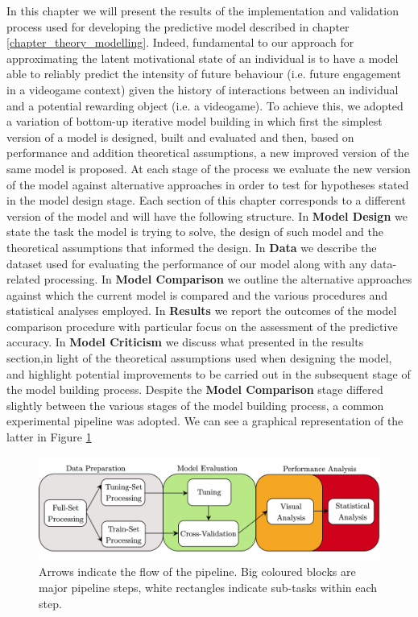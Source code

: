 In this chapter we will present the results of the implementation and validation process used for developing the predictive model described in chapter \ref{chapter_theory_modelling}. Indeed, fundamental to our approach for approximating the latent motivational state of an individual is to have a model able to reliably predict the intensity of future behaviour (i.e. future engagement in a videogame context) given the history of interactions between an individual and a potential rewarding object (i.e. a videogame). To achieve this, we adopted a variation of bottom-up iterative model building \cite{gelman2020bayesian} in which first the simplest version of a model is designed, built and evaluated and then, based on performance and addition theoretical assumptions, a new improved version of the same model is proposed. At each stage of the process we evaluate the new version of the model against alternative approaches in order to test for hypotheses stated in the model design stage. Each section of this chapter corresponds to a different version of the model and will have the following structure. In \textbf{Model Design} we state the task the model is trying to solve, the design of such model and the theoretical assumptions that informed the design. In \textbf{Data} we describe the dataset used for evaluating the performance of our model along with any data-related processing. In \textbf{Model Comparison} we outline the alternative approaches against which the current model is compared and the various procedures and statistical analyses employed. In \textbf{Results} we report the outcomes of the model comparison procedure with particular focus on the assessment of the predictive accuracy. In \textbf{Model Criticism} we discuss what presented in the results section,in light of the theoretical assumptions used when designing the model, and highlight potential improvements to be carried out in the subsequent stage of the model building process. Despite the \textbf{Model Comparison} stage differed slightly between the various stages of the model building process, a common experimental pipeline was adopted. We can see a graphical representation of the latter in Figure \ref{fig: pipeline_eval}
\begin{figure}[h]
  \centering
  \includegraphics[width=\textwidth]{images/chapter_3/pipeline_eval.png}
    \caption[\textbf{Model implementation experimental pipeline}]{Arrows indicate the flow of the pipeline. Big coloured blocks are major pipeline steps, white rectangles indicate sub-tasks within each step.}
    \label{fig: pipeline_eval}
\end{figure}
